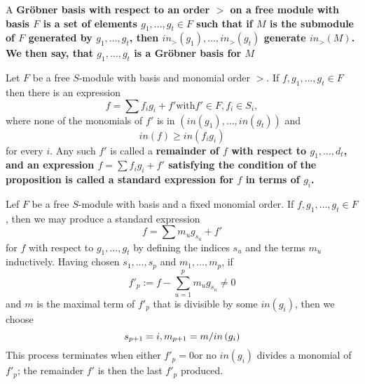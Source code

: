 \documentclass{article}
\begin{document}



\begin{defn}
	A \bf{Gr\"obner basis} with respect to an order \(  > \) on a free module with basis \( F\) is a set of elements \( g_1, \dots , g_t \in F \) such that if \( M \) is the submodule of \( F \) generated by \( g_1 , \dots,g_t \), then \( in_{>} \left(  g_1 \right),\dots, in_{>} \left( g_t \right) \) generate \( in_{>} \left( M \right)\).
	We then say, that \( g_1, \dots, g_t \) is a \bf{ Gr\"obner basis for \( M \) }
\end{defn}
\begin{propdef}[ \nocite{Eis1}{15.6}]
	Let \( F \) be a free \( S \)-module with basis and monomial order \( > \). If \( f,g_1,\dots,g_t \in F \) then there is an expression
	\[
		f= \sum f_i g_i +f' \text{with} f' \in F, f_i \in S_i ,
	\]
	where none of the monomials of \( f'\) is in 
	\( \left( in(g_1),\dots,in(g_t) \right) \) and
	\[
		in\left( f \right) \ge in\left( f_i g_i  \right)
	\]
	for every \( i \). Any such \( f' \) is called a \bf{remainder} of \( f \) with respect to \( g_1,\dots,d_t \), and an expression 
	\( f=\sum f_i g_i + f' \)
	satisfying the condition of the proposition is called a \bf{standard expression} for \( f \) in terms of \( g_i \).
\end{propdef}
\begin{algo}
	Lef \( F \) be a free \( S\)-module with basis and a fixed monomial order. 
	If 
	\( f,g_1,\dots,g_t \in F \)
	, then we may produce a standard expression
	\[
		f=\sum m_u g_{s_u} +f'
	\]
	for \(f\) with respect to 
	\( g_1,\dots,g_t \)
	by defining the indices \(s_u\)
	and the terms \(m_u\) inductively.
	Having chosen 
	\( s_1,\dots,s_p \)
	and 
	\( m_1,\dots,m_p\),
	if 
	\[
		f'_p:=f-\sum_{u=1}^{p} m_u g_{s_u} \neq 0
	\]
and \( m \) is the maximal term of \(f'_p \) that is divisible by some \( in\left( g_i \right) \),
then we choose
	\[
		s_{p+1}=i , \\
		m_{p+1}=m / in\left( g_i \right)
	\]
	This process terminates when either 
	\( f'_p=0 \)or no \( in\left( g_i \right) \) divides a monomial of 
	\( f'_p\);
	the remainder \(f'\) is then the last \( f'_p \) produced.
\end{algo}
\end{document}

